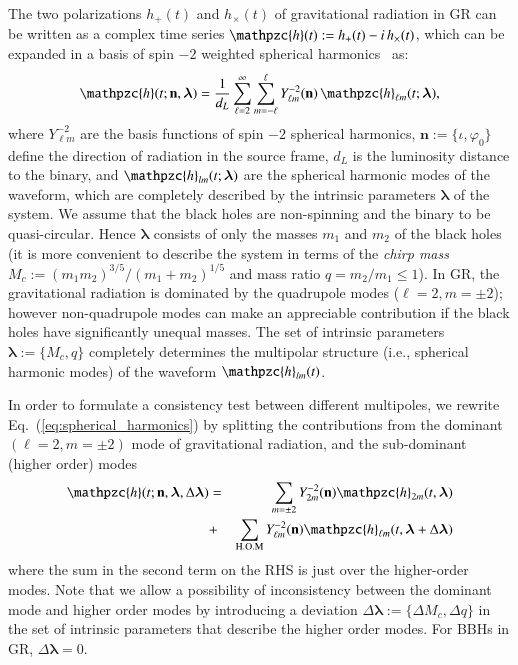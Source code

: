 \documentclass[prl,preprintnumbers,twocolumn,eqsecnum,floatfix,a4paper,nofootinbib,superscriptaddress]{revtex4}
\newcommand{\h}{\mathpzc{h}}
\newcommand{\hlm}{\mathpzc{h}_{\ell m}}
\newcommand{\Ylm}{{Y}^{-2}_{\ell m}}
\newcommand{\blambda}{\bm{\lambda}}
\newcommand{\n}{\mathbf{n}}
\begin{document}
The two polarizations $h_+(t)$ and $h_\times(t)$ of gravitational radiation in GR can be written as a complex time series $\h(t) := h_+(t) - i \, h_\times(t)$, which can be expanded in a basis of spin $-2$ weighted spherical harmonics~\cite{NewmanPenrose} as:
\begin{equation}
\h(t; \n, \blambda) =  \frac{1}{d_L} \sum _{\ell=2}^{\infty} \sum _{m=-\ell}^{\ell} \Ylm (\n) \, {{\hlm}(t; \blambda)}, 
\label{eq:spherical_harmonics}
\end{equation}
where $\Ylm$ are the basis functions of spin $-2$ spherical harmonics, $\n := \{\iota, \varphi_0\}$ define the direction of radiation in the source frame, $d_L$ is  the luminosity distance to the binary, and ${\h}_{lm}(t; \blambda)$ are the spherical harmonic modes of the waveform, which are completely described by the intrinsic parameters $\blambda$ of the system. We assume that the black holes are non-spinning and the binary to be quasi-circular. Hence $\blambda$ consists of only the masses $m_1$ and $m_2$ of the black holes (it is more convenient to describe the system in terms of the \emph{chirp mass} $M_c := {(m_1m_2)^{3/5}}/{(m_1+m_2)^{1/5}}$ and mass ratio $q = m_2/m_1 \leq 1$). In GR, the gravitational radiation is dominated by the quadrupole modes ($\ell = 2, m = \pm 2$); however non-quadrupole modes can make an appreciable contribution if the black holes have significantly unequal masses. The set of intrinsic parameters $\blambda := \{M_c, q\}$ completely determines the multipolar structure (i.e., spherical harmonic modes) of the waveform ${\h}_{lm}(t)$. 

In order to formulate a consistency test between different multipoles, we rewrite Eq.~(\ref{eq:spherical_harmonics}) by splitting the contributions from the dominant $(\ell = 2, m = \pm 2)$ mode of gravitational radiation, and the sub-dominant (higher order) modes 
\begin{eqnarray}
\h(t; \n, \blambda, \Delta \blambda) & = & \sum_{m = \pm2} Y^{-2}_{2m} (\n) {\h}_{2m}(t, \blambda)  \nonumber \\ 
& + & \sum _{\text{H.O.M}} \Ylm (\n) \hlm(t, \blambda+\Delta \blambda)
\label{eq:test_HM}
\end{eqnarray}
where the sum in the second term on the RHS is just over the higher-order modes. Note that we allow a possibility of inconsistency between the dominant mode and higher order modes by introducing a deviation $\Delta \blambda := \{\Delta M_c, \Delta q\}$ in the set of intrinsic parameters that describe the higher order modes. For BBHs in GR,  $\Delta \blambda = 0$. 
\end{document}
